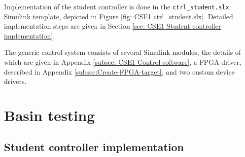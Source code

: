 \documentclass[a4paper,twoside,english]{report}
\begin{document}
Implementation of the student controller is done in the \texttt{ctrl\_student.slx}
Simulink template, depicted in Figure \ref{fig: CSE1 ctrl_student.slx}.
Detailed implementation steps are given in Section \ref{sec: CSE1 Student controller implementation}.

The generic control system consists of several Simulink modules, the
details of which are given in Appendix \ref{subsec: CSE1 Control software},
a FPGA driver, described in Appendix \ref{subsec:Create-FPGA-target},
and two custom device drivers.

\clearpage{}

\section{Basin testing}

\subsection{\label{sec: CSE1 Student controller implementation}Student controller
implementation}
\end{document}
